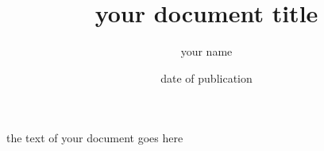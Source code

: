 \documentclass[a4paper,11pt]{book}
\begin{document}
	\title{your document title}
	\author{your name}
	\date{date of publication}
	\maketitle

	\tableofcontents
	the text of your document goes here
\end{document}
